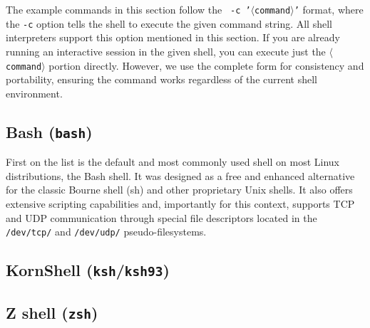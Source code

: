 The example commands in this section follow the \texttt{\shell\ -c '\textcolor{placeholder}{$\langle$command$\rangle$}'} format, where the \texttt{-c} option tells the shell to execute the given command string. All shell interpreters support this option mentioned in this section. If you are already running an interactive session in the given shell, you can execute just the \texttt{\textcolor{placeholder}{$\langle$command$\rangle$}} portion directly. However, we use the complete form for consistency and portability, ensuring the command works regardless of the current shell environment.


\subsection{Bash (\texttt{bash})}


First on the list is the default and most commonly used shell on most Linux distributions, the Bash shell. It was designed as a free and enhanced alternative for the classic Bourne shell (sh) and other proprietary Unix shells. It also offers extensive scripting capabilities and, importantly for this context, supports TCP and UDP communication through special file descriptors located in the \texttt{/dev/tcp/} and \texttt{/dev/udp/} pseudo-filesystems.






\subsection{KornShell (\texttt{ksh}/\texttt{ksh93})}





\subsection{Z shell (\texttt{zsh})}

